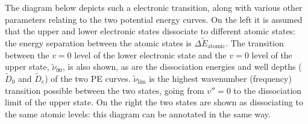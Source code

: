 \documentclass{article}
\theoremstyle{plain}\theoremheaderfont{\normalfont\itshape}\theorembodyfont{\rmfamily}\theoremseparator{.}\newtheorem*{rem}{Remark}\newtheorem*{ex}{Example}\newtheorem*{proof}{Proof}\newtheorem*{altp}{Alternative proof}
\theoremstyle{plain}\theoremheaderfont{\normalfont\bfseries}\theorembodyfont{\rmfamily}\theoremseparator{.}\newtheorem{thm}{Theorem}[section]\newtheorem{lem}[thm]{Lemma}\newtheorem{prop}[thm]{Proposition}\newtheorem*{cor}{Corollary}\newtheorem{defn}[thm]{Definition}\newtheorem{clm}[thm]{Claim}\newtheorem{clminproof}{Claim}\newtheorem{pos}{Postulate}[section]
\theoremstyle{break}\theoremheaderfont{\normalfont\itshape}\theorembodyfont{\rmfamily}\theoremseparator{.\medskip}\newtheorem*{proofskip}{Proof}\newtheorem*{exs}{Examples}\newtheorem*{rems}{Remarks}
\theoremstyle{break}\theoremheaderfont{\normalfont\bfseries}\theorembodyfont{\rmfamily}\theoremseparator{.\medskip}\newtheorem{lemskip}[thm]{Lemma}\newtheorem{defnskip}[thm]{Definition}\newtheorem{propskip}[thm]{Proposition}\newtheorem{thmskip}[thm]{Theorem}
\numberwithin{equation}{section}
\begin{document}
    The diagram below depicts such a electronic transition, along with various other parameters relating to the two potential energy curves. On the left it is assumed that the upper and lower electronic states dissociate to different atomic states: the energy separation between the atomic states is \(\Delta \tilde{E}_{\text{atomic}}\). The transition between the \(v=0\) level of the lower electronic state and the \(v=0\) level of the upper state, \(\tilde{\nu}_{00}\), is also shown, as are the dissociation energies and well depths (\(\tilde{D}_0\) and \(\tilde{D}_e\)) of the two PE curves. \(\tilde{\nu}_{\text{lim}}\) is the highest wavenumber (frequency) transition possible between the two states, going from \(v''=0\) to the dissociation limit of the upper state. On the right the two states are shown as dissociating to the same atomic levels: this diagram can be annotated in the same way.
\end{document}
